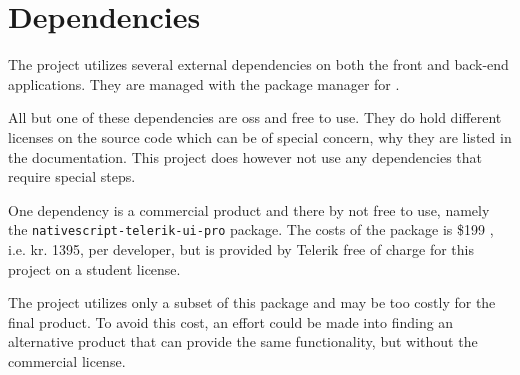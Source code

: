 \chapter{Dependencies}
The project utilizes several external dependencies on both the front and back-end applications.
They are managed with the package manager  for .

All but one of these dependencies are \gls{oss} and free to use.
They do hold different licenses on the source code which can be of special concern, why they are listed in the documentation. 
This project does however not use any dependencies that require special steps.

One dependency is a commercial product and there by not free to use, namely the \verb+nativescript-telerik-ui-pro+ package.
The costs of the package is \$199 \citep{dependencies:nativescript}, i.e. kr. 1395, per developer, but is provided by Telerik free of charge for this project on a student license.

The project utilizes only a subset of this package and may be too costly for the final product.
To avoid this cost, an effort could be made into finding an alternative product that can provide the same functionality, but without the commercial license.
